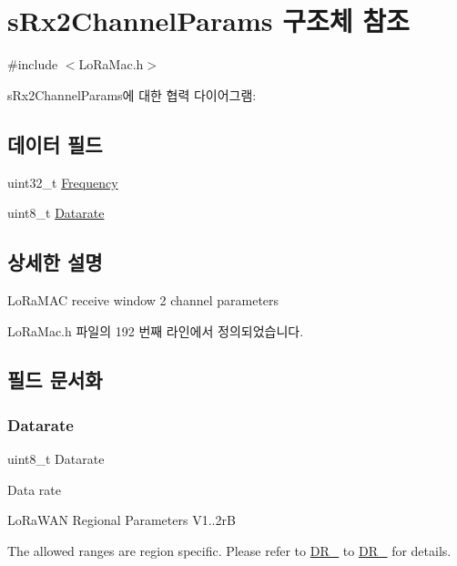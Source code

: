 \hypertarget{structs_rx2_channel_params}{}\section{s\+Rx2\+Channel\+Params 구조체 참조}
\label{structs_rx2_channel_params}


{\ttfamily \#include $<$Lo\+Ra\+Mac.\+h$>$}



s\+Rx2\+Channel\+Params에 대한 협력 다이어그램\+:
\subsection*{데이터 필드}
\begin{DoxyCompactItemize}
\item 
uint32\+\_\+t \mbox{\hyperlink{structs_rx2_channel_params_ade3d190636488dad9a89b19446b7acf1}{Frequency}}
\item 
uint8\+\_\+t \mbox{\hyperlink{structs_rx2_channel_params_a780280c12645b2666878162aab5d8cad}{Datarate}}
\end{DoxyCompactItemize}


\subsection{상세한 설명}
Lo\+Ra\+M\+AC receive window 2 channel parameters 

Lo\+Ra\+Mac.\+h 파일의 192 번째 라인에서 정의되었습니다.



\subsection{필드 문서화}
\mbox{\label{structs_rx2_channel_params_a780280c12645b2666878162aab5d8cad}} 
\subsubsection{\texorpdfstring{Datarate}{Datarate}}
{\footnotesize\ttfamily uint8\+\_\+t Datarate}

Data rate

Lo\+Ra\+W\+AN Regional Parameters V1..\+2rB

The allowed ranges are region specific. Please refer to \mbox{\hyperlink{group___r_e_g_i_o_n_ga6c4ef966b4f3d5eb7597b087f2b97095}{D\+R\+\_}} to \mbox{\hyperlink{group___r_e_g_i_o_n_gac6e078f51b71f05093daf27834997396}{D\+R\+\_}} for details. 

